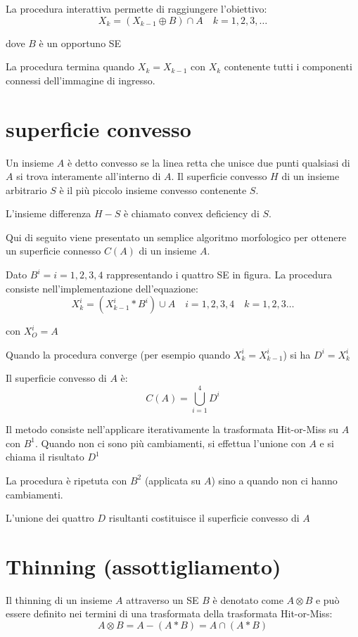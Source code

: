 La procedura interattiva permette di raggiungere l'obiettivo:
$$
X_k = (X_{k-1} \oplus B) \cap A \quad k = 1, 2, 3, \dots
$$

dove $B$ è un opportuno SE

La procedura termina quando $X_k = X_{k-1}$ con $X_k$ contenente tutti i componenti connessi dell'immagine di ingresso.

\section{superficie convesso}
Un insieme $A$ è detto convesso se la linea retta che unisce due punti qualsiasi di $A$ si trova interamente all'interno di $A$. Il superficie convesso $H$ di un insieme arbitrario $S$ è il più piccolo insieme convesso contenente $S$.

L'insieme differenza $H - S$ è chiamato convex deficiency di $S$. 

Qui di seguito viene presentato un semplice algoritmo morfologico per ottenere un superficie connesso $C(A)$ di un insieme $A$.

Dato $B^i = i = 1, 2, 3, 4$ rappresentando i quattro SE in figura. La procedura consiste nell'implementazione dell'equazione:
$$
X_{k}^{i} = (X_{k-1}^{i} * B^i) \cup A \quad i = 1, 2, 3, 4 \quad k = 1, 2, 3 \dots
$$

con $X_{O}^i = A$

Quando la procedura converge (per esempio quando $X_{k}^i = X_{k-1}^i$) si ha $D^i = X_{k}^i$

Il superficie convesso di $A$ è:
$$
C(A) = \bigcup_{i = 1}^{4} D^i
$$

Il metodo consiste nell'applicare iterativamente la trasformata Hit-or-Miss su $A$ con $B^1$. Quando non ci sono più cambiamenti, si effettua l'unione con $A$ e si chiama il risultato $D^1$

La procedura è ripetuta con $B^2$ (applicata su $A$) sino a quando non ci hanno cambiamenti.

L'unione dei quattro $D$ risultanti costituisce il superficie convesso di $A$

\section{Thinning (assottigliamento)}
Il thinning di un insieme $A$ attraverso un SE $B$ è denotato come $A \otimes B$ e può essere definito nei termini di una trasformata della trasformata Hit-or-Miss:
$$
A \otimes B = A - (A * B) = A \cap (A * B)
$$

